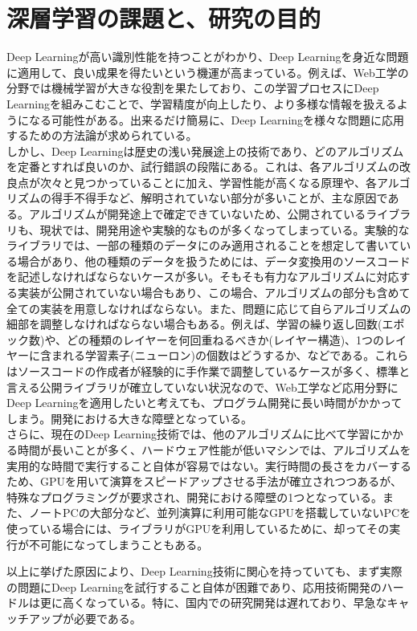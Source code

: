 \section{深層学習の課題と、研究の目的}
Deep Learningが高い識別性能を持つことがわかり、Deep Learningを身近な問題に適用して、良い成果を得たいという機運が高まっている。例えば、Web工学の分野では機械学習が大きな役割を果たしており、この学習プロセスにDeep Learningを組みこむことで、学習精度が向上したり、より多様な情報を扱えるようになる可能性がある。出来るだけ簡易に、Deep Learningを様々な問題に応用するための方法論が求められている。\\
しかし、Deep Learningは歴史の浅い発展途上の技術であり、どのアルゴリズムを定番とすれば良いのか、試行錯誤の段階にある。これは、各アルゴリズムの改良点が次々と見つかっていることに加え、学習性能が高くなる原理や、各アルゴリズムの得手不得手など、解明されていない部分が多いことが、主な原因である。アルゴリズムが開発途上で確定できていないため、公開されているライブラリも、現状では、開発用途や実験的なものが多くなってしまっている。実験的なライブラリでは、一部の種類のデータにのみ適用されることを想定して書いている場合があり、他の種類のデータを扱うためには、データ変換用のソースコードを記述しなければならないケースが多い。そもそも有力なアルゴリズムに対応する実装が公開されていない場合もあり、この場合、アルゴリズムの部分も含めて全ての実装を用意しなければならない。また、問題に応じて自らアルゴリズムの細部を調整しなければならない場合もある。例えば、学習の繰り返し回数(エポック数)や、どの種類のレイヤーを何回重ねるべきか(レイヤー構造)、1つのレイヤーに含まれる学習素子(ニューロン)の個数はどうするか、などである。これらはソースコードの作成者が経験的に手作業で調整しているケースが多く、標準と言える公開ライブラリが確立していない状況なので、Web工学など応用分野にDeep Learningを適用したいと考えても、プログラム開発に長い時間がかかってしまう。開発における大きな障壁となっている。\\
さらに、現在のDeep Learning技術では、他のアルゴリズムに比べて学習にかかる時間が長いことが多く、ハードウェア性能が低いマシンでは、アルゴリズムを実用的な時間で実行すること自体が容易ではない。実行時間の長さをカバーするため、GPUを用いて演算をスピードアップさせる手法が確立されつつあるが、特殊なプログラミングが要求され、開発における障壁の1つとなっている。また、ノートPCの大部分など、並列演算に利用可能なGPUを搭載していないPCを使っている場合には、ライブラリがGPUを利用しているために、却ってその実行が不可能になってしまうこともある。\par
以上に挙げた原因により、Deep Learning技術に関心を持っていても、まず実際の問題にDeep Learningを試行すること自体が困難であり、応用技術開発のハードルは更に高くなっている。特に、国内での研究開発は遅れており、早急なキャッチアップが必要である。\par
